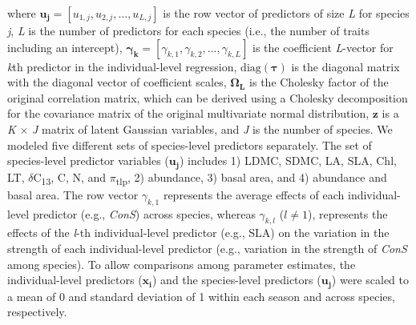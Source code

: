 \documentclass[
  12pt,
  letterpaper,
  DIV=11,
  numbers=noendperiod]{scrartcl}
\begin{document}
where
\(\boldsymbol{u_{j}} = \left[u_{1,j}, u_{2,j}, \ldots, u_{L,j} \right]\)
is the row vector of predictors of size \emph{L} for species \emph{j},
\emph{L} is the number of predictors for each species (i.e., the number
of traits including an intercept),
\(\boldsymbol{\gamma_k} = \left[\gamma_{k,1}, \gamma_{k,2}, \ldots, \gamma_{k,L} \right]\)
is the coefficient \emph{L}-vector for \emph{k}th predictor in the
individual-level regression, \(\mathrm{diag}(\boldsymbol{\tau})\) is the
diagonal matrix with the diagonal vector of coefficient scales,
\(\boldsymbol{\Omega_L}\) is the Cholesky factor of the original
correlation matrix, which can be derived using a Cholesky decomposition
for the covariance matrix of the original multivariate normal
distribution, \(\boldsymbol{z}\) is a \emph{K} \(\times\) \emph{J}
matrix of latent Gaussian variables, and \emph{J} is the number of
species. We modeled five different sets of species-level predictors
separately. The set of species-level predictor variables
(\(\boldsymbol{u_j}\)) includes 1) LDMC, SDMC, LA, SLA, Chl, LT,
\(\delta\)C\textsubscript{13}, C, N, and \(\pi\)\textsubscript{tlp}, 2)
abundance, 3) basal area, and 4) abundance and basal area. The row
vector \(\gamma_{k,1}\) represents the average effects of each
individual-level predictor (e.g., \emph{ConS}) across species, whereas
\(\gamma_{k, l}\) (\(l \ne 1\)), represents the effects of the
\emph{l}-th individual-level predictor (e.g., SLA) on the variation in
the strength of each individual-level predictor (e.g., variation in the
strength of \emph{ConS} among species). To allow comparisons among
parameter estimates, the individual-level predictors
(\(\boldsymbol{x_i}\)) and the species-level predictors
(\(\boldsymbol{u_j}\)) were scaled to a mean of 0 and standard deviation
of 1 within each season and across species, respectively.
\end{document}
